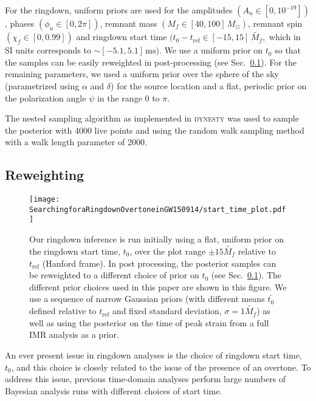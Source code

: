 For the ringdown, uniform priors are used for the amplitudes $(A_n \in [0,10^{-19}])$, phases $(\phi_n \in [0,2\pi])$, remnant mass $(M_f \in [40,100]\,M_\odot )$, remnant spin $(\chi_f \in [0,0.99])$ and ringdown start time $(t_0-t_\mathrm{ref} \in [-15, 15]\,\tilde{M_f},$ which in SI units corresponds to $\sim[-5.1,5.1]\, \mathrm{ms})$.
We use a uniform prior on $t_0$ so that the samples can be easily reweighted in post-processing (see Sec.~\ref{subsec:reweighting}). 
For the remaining parameters, we used a uniform prior over the sphere of the sky (parametrized using $\alpha$ and $\delta$) for the source location and a flat, periodic prior on the polarization angle $\psi$ in the range $0$ to $\pi$.

The nested sampling \cite{Skilling:2006gxv} algorithm as implemented in \textsc{dynesty} \cite{Speagle:2019ivv} was used to sample the posterior with 4000 live points and using the random walk sampling method with a walk length parameter of 2000.


\subsection{Reweighting} \label{subsec:reweighting}

\begin{figure}[t]
	\texttt{[image: SearchingforaRingdownOvertoneinGW150914/start\_time\_plot.pdf]}
	\caption[Different prior choices for the ringdown start time used for the GW150914 analysis]{ 
		Our ringdown inference is run initially using a flat, uniform prior on the ringdown start time, $t_0$, over the plot range $\pm 15 \tilde{M_f}$ relative to $t_\mathrm{ref}$ (Hanford frame).
		In post processing, the posterior samples can be reweighted to a different choice of prior on $t_0$ (see Sec.~\ref{subsec:reweighting}). 
		The different prior choices used in this paper are shown in this figure. 
		We use a sequence of narrow Gaussian priors (with different means $\bar{t_0}$ defined relative to $t_\mathrm{ref}$ and fixed standard deviation, $\sigma=1\tilde{M_f}$) as well as using the posterior on the time of peak strain from a full IMR analysis as a prior.
	}
	\label{fig:start_time}
\end{figure}

An ever present issue in ringdown analyses is the choice of ringdown start time, $t_0$, and this choice is closely related to the issue of the presence of an overtone.
To address this issue, previous time-domain analyses \cite{Isi:2019aib, Cotesta:2022pci, Isi:2022mhy} perform large numbers of Bayesian analysis runs with different choices of start time.


